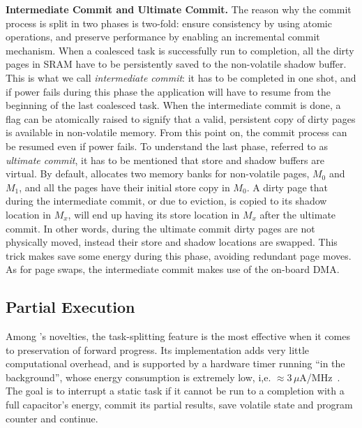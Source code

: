 \textbf{Intermediate Commit and Ultimate Commit.} The reason why the commit process is split in two phases is two-fold: ensure consistency by using atomic operations, and preserve performance by enabling an incremental commit mechanism. When a coalesced task is successfully run to completion, all the dirty pages in SRAM have to be persistently saved to the non-volatile shadow buffer. This is what we call \emph{intermediate commit}: it has to be completed in one shot, and if power fails during this phase the application will have to resume from the beginning of the last coalesced task. When the intermediate commit is done, a flag can be atomically raised to signify that a valid, persistent copy of dirty pages is available in non-volatile memory. From this point on, the commit process can be resumed even if power fails.
To understand the last phase, referred to as \emph{ultimate commit}, it has to be mentioned that store and shadow buffers are virtual. By default, \sys allocates two memory banks for non-volatile pages, $M_0$ and $M_1$, and all the pages have their initial store copy in $M_0$. A dirty page that during the intermediate commit, or due to eviction, is copied to its shadow location in $M_x$, will end up having its store location in $M_x$ after the ultimate commit. In other words, during the ultimate commit dirty pages are not physically moved, instead their store and shadow locations are swapped. This trick makes \sys save some energy during this phase, avoiding redundant page moves. As for page swaps, the intermediate commit makes use of the on-board DMA.

\subsection{Partial Execution}

Among \sys's novelties, the task-splitting feature is the most effective when it comes to preservation of forward progress. Its implementation adds very little computational overhead, and is supported by a hardware timer running ``in the background'', whose energy consumption is extremely low, i,e. $\approx$3\,$\mu$A/MHz~\cite{msp430datasheet}. The goal is to interrupt a static task if it cannot be run to a completion with a full capacitor's energy, commit its partial results, save volatile state and program counter and continue. 

